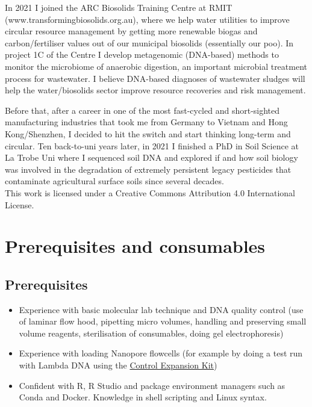 \documentclass[
]{book}
\providecommand{\tightlist}{%
  \setlength{\itemsep}{0pt}\setlength{\parskip}{0pt}}
\begin{document}
In 2021 I joined the ARC Biosolids Training Centre at RMIT (www.transformingbiosolids.org.au), where we help water utilities to improve circular resource management by getting more renewable biogas and carbon/fertiliser values out of our municipal biosolids (essentially our poo). In project 1C of the Centre I develop metagenomic (DNA-based) methods to monitor the microbiome of anaerobic digestion, an important microbial treatment process for wastewater. I believe DNA-based diagnoses of wastewater sludges will help the water/biosolids sector improve resource recoveries and risk management.

Before that, after a career in one of the most fast-cycled and short-sighted manufacturing industries that took me from Germany to Vietnam and Hong Kong/Shenzhen, I decided to hit the switch and start thinking long-term and circular. Ten back-to-uni years later, in 2021 I finished a PhD in Soil Science at La Trobe Uni where I sequenced soil DNA and explored if and how soil biology was involved in the degradation of extremely persistent legacy pesticides that contaminate agricultural surface soils since several decades.\\

This work is licensed under a Creative Commons Attribution 4.0 International License.

\chapter{Prerequisites and consumables}\label{prerequisites}

\section{Prerequisites}\label{prerequisites-1}

\begin{itemize}
\tightlist
\item
  Experience with basic molecular lab technique and DNA quality control (use of laminar flow hood, pipetting micro volumes, handling and preserving small volume reagents, sterilisation of consumables, doing gel electrophoresis)
\item
  Experience with loading Nanopore flowcells (for example by doing a test run with Lambda DNA using the \href{https://store.nanoporetech.com/control-expansion.html}{Control Expansion Kit})\\
\item
  Confident with R, R Studio and package environment managers such as Conda and Docker. Knowledge in shell scripting and Linux syntax.
\end{itemize}
\end{document}

